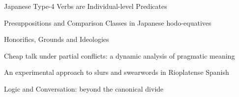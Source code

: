 \documentclass[12pt]{jarticle}
\begin{document}
      {Japanese Type-4 Verbs are Individual-level Predicates}
      {}
  
      {Presuppositions and Comparison Classes in Japanese hodo-equatives}
      {}




  
      {Honorifics, Grounds and Ideologies}
      {}
  
      {Cheap talk under partial conflicts: a dynamic analysis of pragmatic meaning}
      {}
  
      {An experimental approach to slurs and swearwords in Rioplatense Spanish}
      {}




  
      {Logic and Conversation: beyond the canonical divide}
      {}







  
\end{document}
